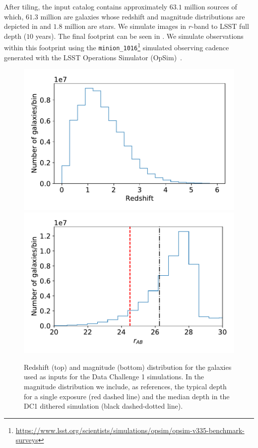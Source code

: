 \documentclass[twocolumn]{aastex62}
\begin{document}
After tiling, the input catalog contains approximately $63.1$ million sources of which, $61.3$ million are galaxies whose redshift and magnitude distributions are depicted in  and $1.8$ million are stars. We simulate images in $r$-band to LSST full depth ($10$ years). The final footprint can be seen in . We simulate observations within this footprint using the \texttt{minion\_1016}\footnote{\url{https://www.lsst.org/scientists/simulations/opsim/opsim-v335-benchmark-surveys}} simulated observing cadence generated with the LSST Operations Simulator (OpSim)~\citep{2014SPIE.9150E..15D}.

\begin{figure}
\centering
\includegraphics[width=0.9\columnwidth]{N_z_DC1.pdf}
\includegraphics[width=0.9\columnwidth]{N_m_DC1.pdf}
\caption{Redshift (top) and magnitude (bottom) distribution for the galaxies used as inputs for the Data Challenge 1 simulations. In the magnitude distribution we include, as references, the typical depth for a single exposure (red dashed line) and the median depth in the DC1 dithered simulation (black dashed-dotted line).}
\label{fig:catalog_plots}
\end{figure}
\end{document}
